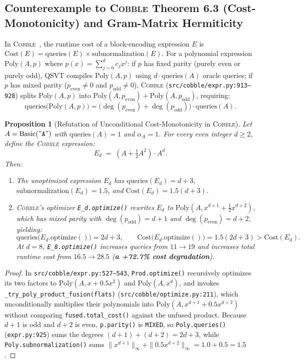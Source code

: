 \documentclass[11pt,a4paper]{article}
\newtheorem{proposition}[theorem]{Proposition}
\theoremstyle{definition}
\begin{document}
\subsection{Counterexample to \textsc{Cobble} Theorem 6.3 (Cost-Monotonicity) and Gram-Matrix Hermiticity}

In \textsc{Cobble}~\cite{yuan2026cobble}, the runtime cost of a block-encoding expression $E$ is $\mathrm{Cost}(E) = \mathrm{queries}(E) \times \mathrm{subnormalization}(E)$. For a polynomial expression $\mathrm{Poly}(A, p)$ where $p(x) = \sum_{j=0}^d c_j x^j$: if $p$ has fixed parity (purely even or purely odd), QSVT compiles $\mathrm{Poly}(A, p)$ using $d \cdot \mathrm{queries}(A)$ oracle queries; if $p$ has mixed parity ($p_{\mathrm{even}} \neq 0$ and $p_{\mathrm{odd}} \neq 0$), \textsc{Cobble} (\texttt{src/cobble/expr.py:913--928}) splits $\mathrm{Poly}(A, p)$ into $\mathrm{Poly}(A, p_{\mathrm{even}}) + \mathrm{Poly}(A, p_{\mathrm{odd}})$, requiring:
\[
  \mathrm{queries}\big(\mathrm{Poly}(A, p)\big) = \big(\deg(p_{\mathrm{even}}) + \deg(p_{\mathrm{odd}})\big) \cdot \mathrm{queries}(A).
\]

\begin{proposition}[Refutation of Unconditional Cost-Monotonicity in \textsc{Cobble}]
\label{prop:cobble-refutation}
Let $A = \mathrm{Basic}(\mathtt{"A"})$ with $\mathrm{queries}(A) = 1$ and $\alpha_A = 1$. For every even integer $d \ge 2$, define the \textsc{Cobble} expression:
\[
  E_d \;=\; \left(A + \tfrac{1}{2} A^2\right) \cdot A^d.
\]
Then:
\begin{enumerate}
  \item The unoptimized expression $E_d$ has $\mathrm{queries}(E_d) = d + 3$, $\mathrm{subnormalization}(E_d) = 1.5$, and $\mathrm{Cost}(E_d) = 1.5(d + 3)$.
  \item \textsc{Cobble}'s optimizer \texttt{E\_d.optimize()} rewrites $E_d$ to $\mathrm{Poly}(A, x^{d+1} + \frac{1}{2}x^{d+2})$, which has mixed parity with $\deg(p_{\mathrm{odd}}) = d+1$ and $\deg(p_{\mathrm{even}}) = d+2$, yielding:
  \[
    \mathrm{queries}\big(E_d.\mathrm{optimize}()\big) = 2d + 3, \qquad \mathrm{Cost}\big(E_d.\mathrm{optimize}()\big) = 1.5(2d + 3) > \mathrm{Cost}(E_d).
  \]
  At $d = 8$, \texttt{E\_8.optimize()} increases queries from $11 \to 19$ and increases total runtime cost from $16.5 \to 28.5$ (\textbf{a +72.7\% cost degradation}).
\end{enumerate}
\end{proposition}
\begin{proof}
In \texttt{src/cobble/expr.py:527--543}, \texttt{Prod.optimize()} recursively optimizes its two factors to $\mathrm{Poly}(A, x + 0.5x^2)$ and $\mathrm{Poly}(A, x^d)$, and invokes \texttt{\_try\_poly\_product\_fusion(flats)} (\texttt{src/cobble/optimize.py:211}), which unconditionally multiplies their polynomials into $\mathrm{Poly}(A, x^{d+1} + 0.5x^{d+2})$ without comparing \texttt{fused.total\_cost()} against the unfused product. Because $d+1$ is odd and $d+2$ is even, \texttt{p.parity()} is \texttt{MIXED}, so \texttt{Poly.queries()} (\texttt{expr.py:925}) sums the degrees $(d+1) + (d+2) = 2d+3$, while \texttt{Poly.subnormalization()} sums $\|x^{d+1}\|_{\infty} + \|0.5x^{d+2}\|_{\infty} = 1.0 + 0.5 = 1.5$.
\end{proof}
\end{document}
